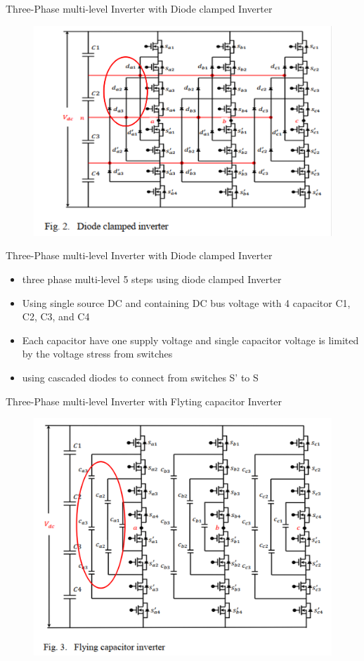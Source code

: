 \documentclass[
	11pt, %
]{beamer}
\begin{document}
\begin{frame}{Three-Phase multi-level Inverter with Diode clamped Inverter}
	\begin{figure}
		\includegraphics[width=0.7\linewidth]{diodeClamped.png}
	\end{figure}
\end{frame}

\begin{frame}{Three-Phase multi-level Inverter with Diode clamped Inverter}
	\begin{itemize}
		\setlength{\itemsep}{10pt}
		\item {three phase multi-level 5 steps using diode clamped Inverter}
		\item {Using single source DC and containing DC bus voltage with 4 capacitor C1, C2, C3, and C4}
		\item {Each capacitor have one supply voltage and single capacitor voltage is limited by the voltage stress from switches}
		\item {using cascaded diodes to connect from switches S' to S}
	\end{itemize}
\end{frame}

\begin{frame}{Three-Phase multi-level Inverter with Flyting capacitor Inverter}
	\begin{figure}
		\includegraphics[width=0.6\linewidth]{flyingcap.png}
	\end{figure}
\end{frame}
\end{document}
